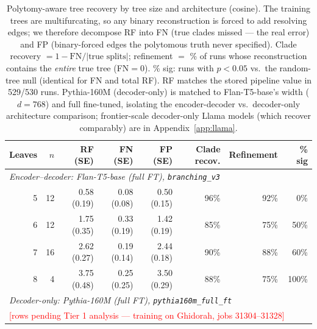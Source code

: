 \documentclass{article}
\begin{document}
\begin{table}[t]
\caption{Polytomy-aware tree recovery by tree size and architecture (cosine). The training
  trees are multifurcating, so any binary reconstruction is forced to add resolving edges;
  we therefore decompose RF into FN (true clades missed --- the real error) and FP
  (binary-forced edges the polytomous truth never specified). Clade recovery
  $= 1 - \mathrm{FN}/|\text{true splits}|$; refinement $=$ \% of runs whose reconstruction
  contains the \emph{entire} true tree (FN$=0$). \% sig: runs with $p<0.05$ vs.\ the
  random-tree null (identical for FN and total RF). RF matches the stored pipeline value in
  529/530 runs. Pythia-160M (decoder-only) is matched to Flan-T5-base's width ($d=768$) and
  full fine-tuned, isolating the encoder-decoder vs.\ decoder-only architecture comparison;
  frontier-scale decoder-only Llama models (which recover comparably) are in
  Appendix~\ref{app:llama}.}
\label{tab:rf_by_leaves}
\begin{center}
\begin{tabular}{rrrrrrrr}
\toprule
Leaves & $n$ & RF (SE) & FN (SE) & FP (SE) & Clade recov. & Refinement & \% sig \\
\midrule
\multicolumn{8}{l}{\textit{Encoder--decoder: Flan-T5-base (full FT), \texttt{branching\_v3}}} \\
5 & 12 & 0.58 (0.19) & 0.08 (0.08) & 0.50 (0.15) & 96\% & 92\% &   0\% \\
6 & 12 & 1.75 (0.35) & 0.33 (0.19) & 1.42 (0.19) & 85\% & 75\% &  50\% \\
7 & 16 & 2.62 (0.27) & 0.19 (0.14) & 2.44 (0.18) & 90\% & 88\% &  60\% \\
8 &  4 & 3.75 (0.48) & 0.25 (0.25) & 3.50 (0.29) & 88\% & 75\% & 100\% \\
\midrule
\multicolumn{8}{l}{\textit{Decoder-only: Pythia-160M (full FT), \texttt{pythia160m\_full\_ft}}} \\
\multicolumn{8}{l}{\textcolor{red}{[rows pending Tier 1 analysis --- training on Ghidorah, jobs 31304--31328]}} \\
\bottomrule
\end{tabular}
\end{center}
\end{table}
\end{document}
